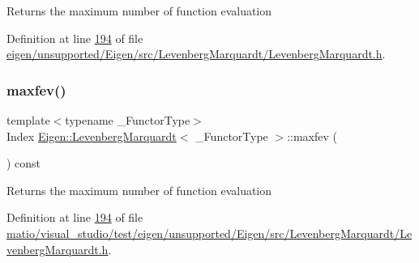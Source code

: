 \begin{DoxyReturn}{Returns}
the maximum number of function evaluation 
\end{DoxyReturn}


Definition at line \hyperlink{eigen_2unsupported_2_eigen_2src_2_levenberg_marquardt_2_levenberg_marquardt_8h_source_l00194}{194} of file \hyperlink{eigen_2unsupported_2_eigen_2src_2_levenberg_marquardt_2_levenberg_marquardt_8h_source}{eigen/unsupported/\+Eigen/src/\+Levenberg\+Marquardt/\+Levenberg\+Marquardt.\+h}.

\mbox{\label{class_eigen_1_1_levenberg_marquardt_a495894dde1fedfba97721f6b4a076901}} 
\subsubsection{\texorpdfstring{maxfev()}{maxfev()}\hspace{0.1cm}{\footnotesize\ttfamily [2/2]}}
{\footnotesize\ttfamily template$<$typename \+\_\+\+Functor\+Type$>$ \\
Index \hyperlink{class_eigen_1_1_levenberg_marquardt}{Eigen\+::\+Levenberg\+Marquardt}$<$ \+\_\+\+Functor\+Type $>$\+::maxfev (\begin{DoxyParamCaption}{ }\end{DoxyParamCaption}) const\hspace{0.3cm}{\ttfamily [inline]}}

\begin{DoxyReturn}{Returns}
the maximum number of function evaluation 
\end{DoxyReturn}


Definition at line \hyperlink{matio_2visual__studio_2test_2eigen_2unsupported_2_eigen_2src_2_levenberg_marquardt_2_levenberg_marquardt_8h_source_l00194}{194} of file \hyperlink{matio_2visual__studio_2test_2eigen_2unsupported_2_eigen_2src_2_levenberg_marquardt_2_levenberg_marquardt_8h_source}{matio/visual\+\_\+studio/test/eigen/unsupported/\+Eigen/src/\+Levenberg\+Marquardt/\+Levenberg\+Marquardt.\+h}.

\mbox{\label{class_eigen_1_1_levenberg_marquardt_ad9563c6abeb33c0aba82e55fd72c64a6}} 
